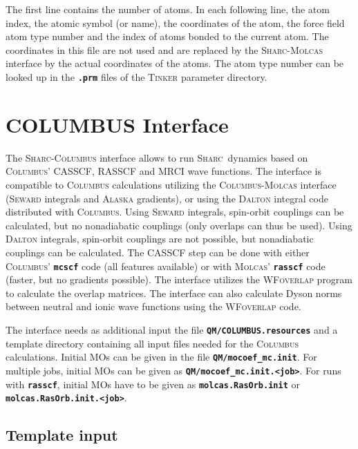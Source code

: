 \documentclass[a4paper,10pt,DIV=15,openany]{scrbook}
\newcommand{\sharc}{\textsc{Sharc}}
\newcommand{\ttt}[1]{\textbf{\texttt{#1}}}
\begin{document}
The first line contains the number of atoms. In each following line, the atom index, the atomic symbol (or name), the coordinates of the atom, the force field atom type number and the index of atoms bonded to the current atom. The coordinates in this file are not used and are replaced by the \sharc-\textsc{Molcas} interface by the actual coordinates of the atoms. The atom type number can be looked up in the \ttt{.prm} files of the \textsc{Tinker} parameter directory. 







\section{COLUMBUS Interface}\label{sec:int:columbus}

The \sharc-\textsc{Columbus} interface allows to run \sharc\ dynamics based on \textsc{Columbus}' CASSCF, RASSCF and MRCI wave functions. 
The interface is compatible to \textsc{Columbus} calculations utilizing the \textsc{Columbus}-\textsc{Molcas} interface (\textsc{Seward} integrals and \textsc{Alaska} gradients), or using the \textsc{Dalton} integral code distributed with \textsc{Columbus}. 
Using \textsc{Seward} integrals, spin-orbit couplings can be calculated, but no nonadiabatic couplings (only overlaps can thus be used).
Using \textsc{Dalton} integrals, spin-orbit couplings are not possible, but nonadiabatic couplings can be calculated.
The CASSCF step can be done with either \textsc{Columbus}' \ttt{mcscf} code (all features available) or with \textsc{Molcas}' \ttt{rasscf} code (faster, but no gradients possible).
The interface utilizes the \textsc{WFoverlap} program to calculate the overlap matrices.
The interface can also calculate Dyson norms between neutral and ionic wave functions using the \textsc{WFoverlap} code.

The interface needs as additional input the file \ttt{QM/COLUMBUS.resources} and a template directory containing all input files needed for the \textsc{Columbus} calculations. Initial MOs can be given in the file \ttt{QM/mocoef\_mc.init}.
For multiple jobs, initial MOs can be given as \ttt{QM/mocoef\_mc.init.<job>}.
For runs with \ttt{rasscf}, initial MOs have to be given as \ttt{molcas.RasOrb.init} or \ttt{molcas.RasOrb.init.<job>}.

\subsection{Template input}
\end{document}
